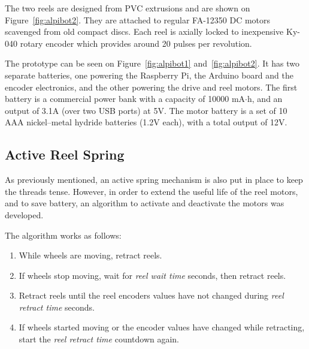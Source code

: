 \documentclass[journal]{IEEEtran}
\begin{document}

The two reels are designed from PVC extrusions and are shown on Figure~\ref{fig:alpibot2}.  They are attached to regular FA-12350 DC motors scavenged from old compact discs.  Each reel is axially locked to inexpensive Ky-040 rotary encoder which provides around 20 pulses per revolution.

The prototype can be seen on Figure~\ref{fig:alpibot1} and~\ref{fig:alpibot2}.  It has two separate batteries, one powering the Raspberry Pi, the Arduino board and the encoder electronics, and the other powering the drive and reel motors. The first battery is a commercial power bank with a capacity of 10000 mA$\cdot$h, and an output of 3.1A (over two USB ports) at 5V. The motor battery is a set of 10 AAA nickel–metal hydride batteries (1.2V each), with a total output of 12V.  

\subsection{Active Reel Spring}

As previously mentioned, an active spring mechanism is also put in place to keep the threads tense.  However, in order to extend the useful life of the reel motors, and to save battery, an algorithm to  activate and deactivate the motors was developed. 

The algorithm works as follows: 

\begin{enumerate}
    \item While wheels are moving, retract reels.
    \item If wheels stop moving, wait for \textit{reel wait time} seconds, then retract reels. 
    \item Retract reels until the reel encoders values have not changed during \textit{reel retract time} seconds.
    \item If wheels started moving or the encoder values have changed while retracting, start the \textit{reel retract time} countdown again.
\end{enumerate}{}

\end{document}

